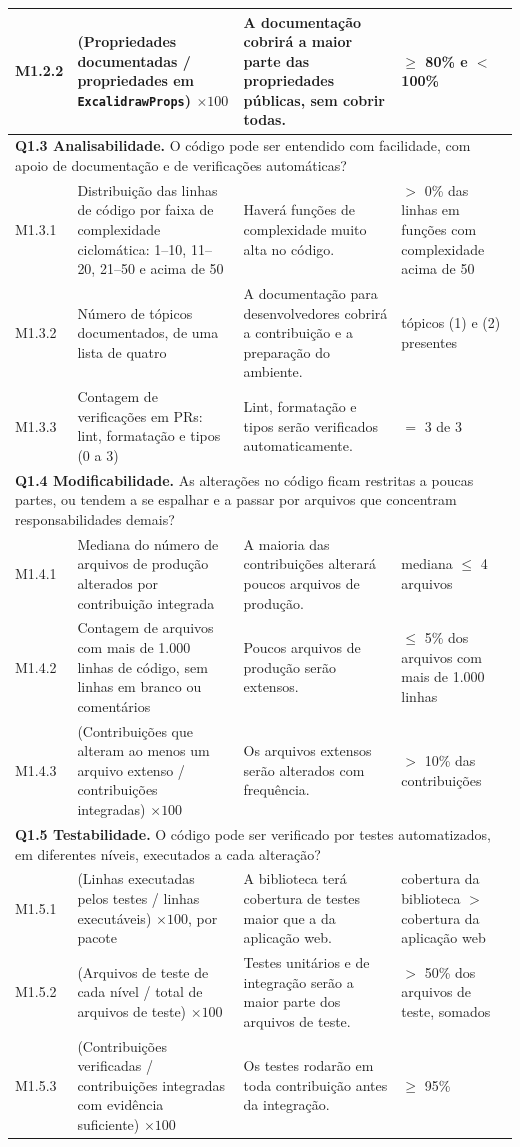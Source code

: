 \documentclass[12pt]{article}
\begin{document}
\begin{table}[!ht]
\begin{tabular}{p{1.2cm}p{5.5cm}p{5.0cm}p{3.6cm}}
M1.2.2 & (Propriedades documentadas / propriedades em \texttt{ExcalidrawProps}) $\times 100$ & A documentação cobrirá a maior parte das propriedades públicas, sem cobrir todas. & $\geq$ 80\% e $<$ 100\% \\
\midrule
\multicolumn{4}{p{16.2cm}}{\textbf{Q1.3 Analisabilidade.} O código pode ser entendido com facilidade, com apoio de documentação e de verificações automáticas?} \\
M1.3.1 & Distribuição das linhas de código por faixa de complexidade ciclomática: 1--10, 11--20, 21--50 e acima de 50 & Haverá funções de complexidade muito alta no código. & $>$ 0\% das linhas em funções com complexidade acima de 50 \\
M1.3.2 & Número de tópicos documentados, de uma lista de quatro & A documentação para desenvolvedores cobrirá a contribuição e a preparação do ambiente. & tópicos (1) e (2) presentes \\
M1.3.3 & Contagem de verificações em PRs: lint, formatação e tipos (0 a 3) & Lint, formatação e tipos serão verificados automaticamente. & $=$ 3 de 3 \\
\midrule
\multicolumn{4}{p{16.2cm}}{\textbf{Q1.4 Modificabilidade.} As alterações no código ficam restritas a poucas partes, ou tendem a se espalhar e a passar por arquivos que concentram responsabilidades demais?} \\
M1.4.1 & Mediana do número de arquivos de produção alterados por contribuição integrada & A maioria das contribuições alterará poucos arquivos de produção. & mediana $\leq$ 4 arquivos \\
M1.4.2 & Contagem de arquivos com mais de 1.000 linhas de código, sem linhas em branco ou comentários & Poucos arquivos de produção serão extensos. & $\leq$ 5\% dos arquivos com mais de 1.000 linhas \\
M1.4.3 & (Contribuições que alteram ao menos um arquivo extenso / contribuições integradas) $\times 100$ & Os arquivos extensos serão alterados com frequência. & $>$ 10\% das contribuições \\
\midrule
\multicolumn{4}{p{16.2cm}}{\textbf{Q1.5 Testabilidade.} O código pode ser verificado por testes automatizados, em diferentes níveis, executados a cada alteração?} \\
M1.5.1 & (Linhas executadas pelos testes / linhas executáveis) $\times 100$, por pacote & A biblioteca terá cobertura de testes maior que a da aplicação web. & cobertura da biblioteca $>$ cobertura da aplicação web \\
M1.5.2 & (Arquivos de teste de cada nível / total de arquivos de teste) $\times 100$ & Testes unitários e de integração serão a maior parte dos arquivos de teste. & $>$ 50\% dos arquivos de teste, somados \\
M1.5.3 & (Contribuições verificadas / contribuições integradas com evidência suficiente) $\times 100$ & Os testes rodarão em toda contribuição antes da integração. & $\geq$ 95\% \\
\bottomrule
\end{tabular}
\end{table}
\end{document}
